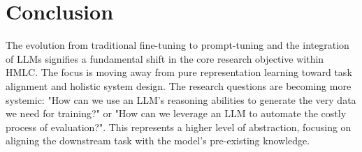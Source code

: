 \chapter{Conclusion}
The evolution from traditional fine-tuning to prompt-tuning and the integration of LLMs signifies a fundamental shift in the core research objective within HMLC. The focus is moving away from pure representation learning toward task alignment and holistic system design. The research questions are becoming more systemic: "How can we use an LLM's reasoning abilities to generate the very data we need for training?" or "How can we leverage an LLM to automate the costly process of evaluation?". 
This represents a higher level of abstraction, focusing on aligning the downstream task with the model's pre-existing knowledge.
